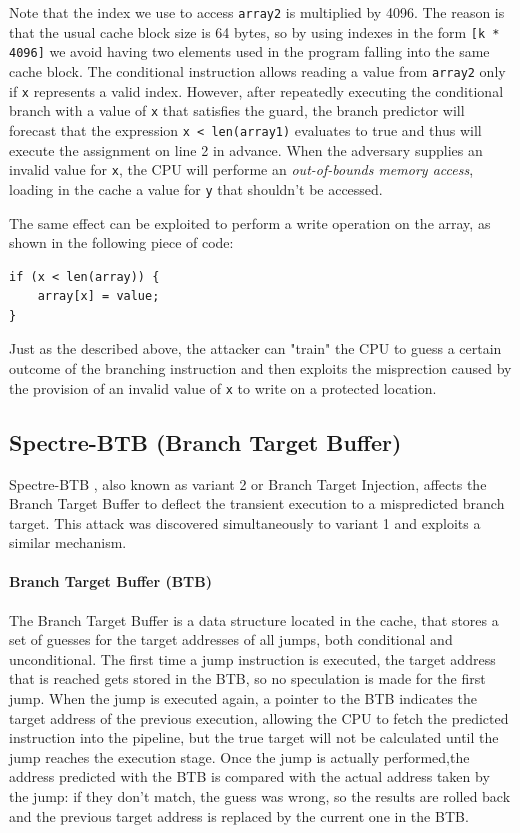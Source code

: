 \documentclass[12pt,a4paper]{book}
\theoremstyle{definition}
\begin{document}
	Note that the index we use to access \texttt{array2} is multiplied by 4096. The reason is that the usual cache block size is 64 bytes, so by using indexes in the form \texttt{[k * 4096]} we avoid having two elements used in the program falling into the same cache block.
	The conditional instruction allows reading a value from \texttt{array2} only if \texttt{x} represents a valid index. However, after repeatedly executing the conditional branch with a value of \texttt{x} that satisfies the guard, the branch predictor will forecast that the expression \texttt{x < len(array1)} evaluates to true and thus will execute the assignment on line 2 in advance. When the adversary supplies an invalid value for \texttt{x}, the CPU will performe an \textit{out-of-bounds memory access}, loading in the cache a value for \texttt{y} that shouldn't be accessed.
	
	The same effect can be exploited to perform a write operation on the array, as shown in the following piece of code:
	
	\vspace{3mm}
	\begin{minipage}{.5\textwidth}
	\begin{lstlisting}
if (x < len(array)) { 
	array[x] = value; 
}
	\end{lstlisting} 
	\end{minipage}
 
	Just as the described above, the attacker can "train" the CPU to guess a certain outcome of the branching instruction and then exploits the misprection caused by the provision of an invalid value of \texttt{x} to write on a protected location.
	\subsection{Spectre-BTB (Branch Target Buffer)}\label{sec:spectre-btb}
	Spectre-BTB \cite{Kocher2019} \cite{Canella2019}, also known as variant 2 or Branch Target Injection, affects the Branch Target Buffer to deflect the transient execution to a mispredicted branch target. This attack was discovered simultaneously to variant 1 and exploits a similar mechanism.
	
	\paragraph{Branch Target Buffer (BTB)} The Branch Target Buffer \cite{Perleberg1989} is a data structure located in the cache, that stores a set of guesses for the target addresses of all jumps, both conditional and unconditional. The first time a jump instruction is executed, the target address that is reached gets stored in the BTB, so no speculation is made for the first jump. When the jump is executed again, a pointer to the BTB indicates the target address of the previous execution, allowing the CPU to fetch the  predicted instruction into the pipeline, but the true target will not be calculated until the jump reaches the execution stage. Once the jump is actually performed,the address predicted with the BTB is compared with the actual address taken by the jump: if they don't match, the guess was wrong, so the results are rolled back and the previous target address is replaced by the current one in the BTB.
\end{document}
